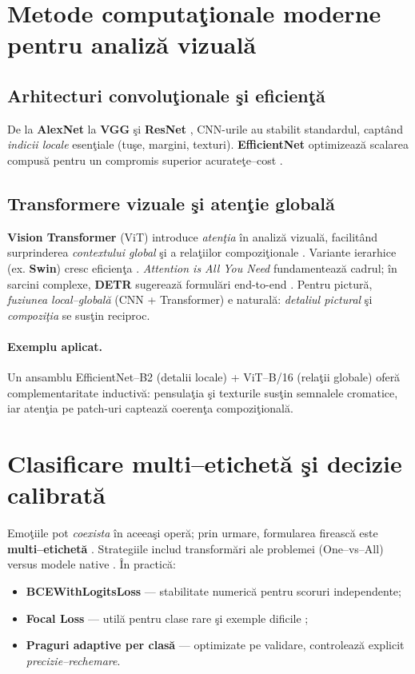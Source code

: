\section{Metode computaţionale moderne pentru analiză vizuală}

\subsection{Arhitecturi convoluţionale şi eficienţă}

De la \textbf{AlexNet} \cite{krizhevsky2012imagenet} la \textbf{VGG} \cite{simonyan2014very} şi \textbf{ResNet} \cite{he2016deep}, CNN-urile au stabilit standardul, captând \emph{indicii locale} esenţiale (tuşe, margini, texturi). \textbf{EfficientNet} optimizează scalarea compusă pentru un compromis superior acurateţe–cost \cite{tan2019efficientnet}.

\subsection{Transformere vizuale şi atenţie globală}

\textbf{Vision Transformer} (ViT) introduce \emph{atenţia} în analiză vizuală, facilitând surprinderea \emph{contextului global} şi a relaţiilor compoziţionale \cite{dosovitskiy2020image}. Variante ierarhice (ex. \textbf{Swin}) cresc eficienţa \cite{liu2021swin}. \emph{Attention is All You Need} \cite{vaswani2017attention} fundamentează cadrul; în sarcini complexe, \textbf{DETR} sugerează formulări end-to-end \cite{carion2020end}. Pentru pictură, \emph{fuziunea local–globală} (CNN + Transformer) e naturală: \emph{detaliul pictural} şi \emph{compoziţia} se susţin reciproc.

\paragraph{Exemplu aplicat.} Un ansamblu EfficientNet–B2 (detalii locale) + ViT–B/16 (relaţii globale) oferă complementaritate inductivă: pensulaţia şi texturile susţin semnalele cromatice, iar atenţia pe patch-uri captează coerenţa compoziţională.

\section{Clasificare multi–etichetă şi decizie calibrată}

Emoţiile pot \emph{coexista} în aceeaşi operă; prin urmare, formularea firească este \textbf{multi–etichetă} \cite{zhang2014review}. Strategiile includ transformări ale problemei (One–vs–All) versus modele native \cite{boutell2004learning}. În practică:
\begin{itemize}[leftmargin=*, itemsep=2pt, topsep=2pt]
  \item \textbf{BCEWithLogitsLoss} — stabilitate numerică pentru scoruri independente;
  \item \textbf{Focal Loss} — utilă pentru clase rare şi exemple dificile \cite{lin2017focal};
  \item \textbf{Praguri adaptive per clasă} — optimizate pe validare, controlează explicit \emph{precizie–rechemare}.
\end{itemize}

